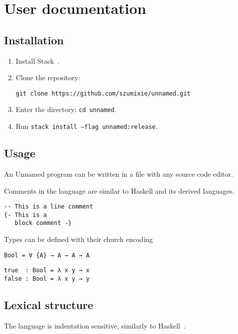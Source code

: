 \chapter{User documentation}\label{ch:userdocs}

\section{Installation}
\begin{enumerate}
  \item Install Stack~\cite{stack}.
  \item Clone the repository:

        \texttt{git clone https://github.com/szumixie/unnamed.git}

  \item Enter the directory: \texttt{cd unnamed}.
  \item Run \texttt{stack install --flag unnamed:release}.
\end{enumerate}

\section{Usage}

An Unnamed program can be written in a file with any source code editor.

Comments in the language are similar to Haskell and its derived languages.

\begin{verbatim}
-- This is a line comment
{- This is a
   block comment -}
\end{verbatim}

Types can be defined with their church encoding

\begin{verbatim}
Bool = ∀ {A} → A → A → A
\end{verbatim}

\begin{verbatim}
true  : Bool = λ x y → x
false : Bool = λ x y → y
\end{verbatim}

\section{Lexical structure}

The language is indentation sensitive, similarly to Haskell~\cite{haskell2010}.

